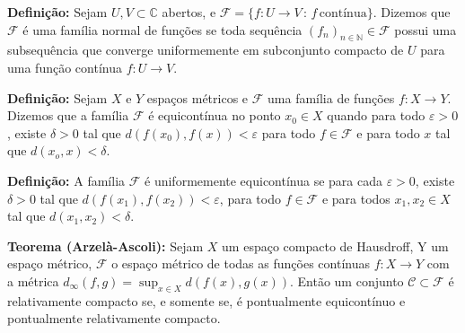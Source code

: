 \textbf{Definição: }Sejam $U,V\subset\mathbb{C}$ abertos, e $\mathcal{F} = \{f\colon U\longrightarrow V\,:\, f\,\textrm{contínua}\}$. Dizemos que $\mathcal{F}$ é uma família normal de funções se toda sequência $(f_n)_{n\in\mathbb{N}}\in\mathcal{F}$ possui uma subsequência que converge uniformemente em subconjunto compacto de $U$ para uma função contínua $f\colon U\longrightarrow V$.

\textbf{Definição: }Sejam $X$ e $Y$ espaços métricos e $\mathcal{F}$ uma família de funções $f\colon X\longrightarrow Y$. Dizemos que a família $\mathcal{F}$ é equicontínua no ponto $x_0\in X$ quando para todo $\varepsilon>0$, existe $\delta>0$ tal que $d(f(x_0),f(x))<\varepsilon$ para todo $f\in\mathcal{F}$ e para todo $x$ tal que $d(x_o,x)<\delta$. 

\textbf{Definição: }A família $\mathcal{F}$ é uniformemente equicontínua se para cada $\varepsilon>0$, existe $\delta>0$ tal que $d(f(x_1),f(x_2))<\varepsilon$, para todo $f\in\mathcal{F}$ e para todos $x_1,x_2\in X$ tal que $d(x_1,x_2)<\delta$.

\textbf{Teorema (Arzelà-Ascoli): }Sejam $X$ um espaço compacto de Hausdroff, Y um espaço métrico, $\mathcal{F}$ o espaço métrico de todas as funções contínuas $f\colon X\longrightarrow Y$ com a métrica $d_{\infty}(f,g)=\displaystyle\sup_{x\in X}{d(f(x),g(x))}$. Então um conjunto $\mathcal{C}\subset\mathcal{F}$ é relativamente compacto se, e somente se, é pontualmente equicontínuo e pontualmente relativamente compacto.


